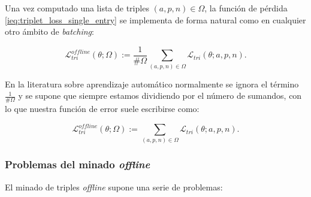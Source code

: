 Una vez computado una lista de triples $(a, p, n) \in \Omega$, la función de pérdida \eqref{ieq:triplet_loss_single_entry} se implementa de forma natural como en cualquier otro ámbito de \textit{batching}:

\begin{equation}
	\mathcal{L}_{tri}^{offline}(\theta; \Omega) := \frac{1}{\#\Omega} \sum_{(a, p, n) \in \Omega} \mathcal{L}_{tri}(\theta; a, p, n).
\end{equation}

En la literatura sobre aprendizaje automático normalmente se ignora el término $\frac{1}{\#\Omega}$ y se supone que siempre estamos dividiendo por el número de sumandos, con lo que nuestra función de error suele escribirse como:

\begin{equation}
	\mathcal{L}_{tri}^{offline}(\theta; \Omega) := \sum_{(a, p, n) \in \Omega} \mathcal{L}_{tri}(\theta; a, p, n).
\end{equation}

\subsubsection{Problemas del minado \textit{offline}}

El minado de triples \textit{offline} supone una serie de problemas:

